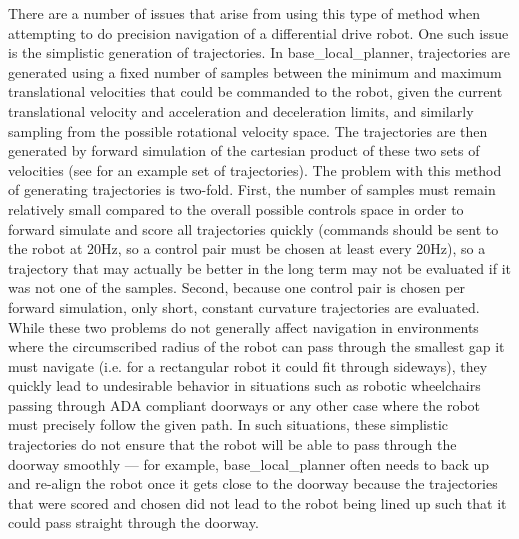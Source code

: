 There are a number of issues that arise from using this type of method when attempting to do precision navigation of a differential drive robot. One such issue is the simplistic generation of trajectories. In base\_local\_planner, trajectories are generated using a fixed number of samples between the minimum and maximum translational velocities that could be commanded to the robot, given the current translational velocity and acceleration and deceleration limits, and similarly sampling from the possible rotational velocity space. The trajectories are then generated by forward simulation of the cartesian product of these two sets of velocities (see  for an example set of trajectories). The problem with this method of generating trajectories is two-fold. First, the number of samples must remain relatively small compared to the overall possible controls space in order to forward simulate and score all trajectories quickly (commands should be sent to the robot at 20Hz, so a control pair must be chosen at least every 20Hz), so a trajectory that may actually be better in the long term may not be evaluated if it was not one of the samples. Second, because one control pair is chosen per forward simulation, only short, constant curvature trajectories are evaluated. While these two problems do not generally affect navigation in environments where the circumscribed radius of the robot can pass through the smallest gap it must navigate (i.e. for a rectangular robot it could fit through sideways), they quickly lead to undesirable behavior in situations such as robotic wheelchairs passing through ADA compliant doorways or any other case where the robot must precisely follow the given path. In such situations, these simplistic trajectories do not ensure that the robot will be able to pass through the doorway smoothly --- for example, base\_local\_planner often needs to back up and re-align the robot once it gets close to the doorway because the trajectories that were scored and chosen did not lead to the robot being lined up such that it could pass straight through the doorway. 

